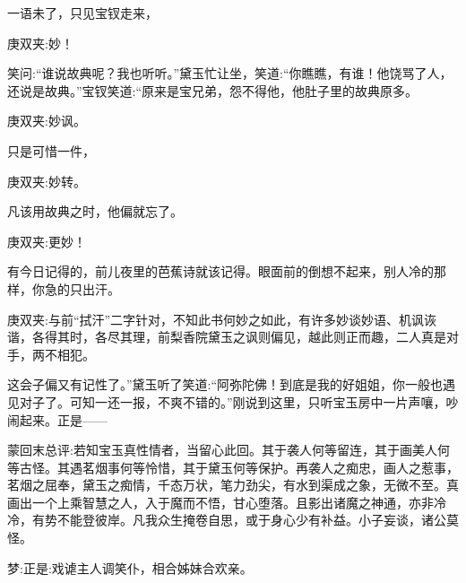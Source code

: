 \begin{parag}
    一语未了，只见宝钗走来，\begin{note}庚双夹:妙！\end{note}笑问:“谁说故典呢？我也听听。”黛玉忙让坐，笑道:“你瞧瞧，有谁！他饶骂了人，还说是故典。”宝钗笑道:“原来是宝兄弟，怨不得他，他肚子里的故典原多。\begin{note}庚双夹:妙讽。\end{note}只是可惜一件，\begin{note}庚双夹:妙转。\end{note}凡该用故典之时，他偏就忘了。\begin{note}庚双夹:更妙！\end{note}有今日记得的，前儿夜里的芭蕉诗就该记得。眼面前的倒想不起来，别人冷的那样，你急的只出汗。\begin{note}庚双夹:与前“拭汗”二字针对，不知此书何妙之如此，有许多妙谈妙语、机讽诙谐，各得其时，各尽其理，前梨香院黛玉之讽则偏见，越此则正而趣，二人真是对手，两不相犯。\end{note}这会子偏又有记性了。”黛玉听了笑道:“阿弥陀佛！到底是我的好姐姐，你一般也遇见对子了。可知一还一报，不爽不错的。”刚说到这里，只听宝玉房中一片声嚷，吵闹起来。正是——
\end{parag}


\begin{parag}
    \begin{note}蒙回末总评:若知宝玉真性情者，当留心此回。其于袭人何等留连，其于画美人何等古怪。其遇茗烟事何等怜惜，其于黛玉何等保护。再袭人之痴忠，画人之惹事，茗烟之屈奉，黛玉之痴情，千态万状，笔力劲尖，有水到渠成之象，无微不至。真画出一个上乘智慧之人，入于魔而不悟，甘心堕落。且影出诸魔之神通，亦非冷冷，有势不能登彼岸。凡我众生掩卷自思，或于身心少有补益。小子妄谈，诸公莫怪。\end{note}
\end{parag}


\begin{parag}
    \begin{note}梦:正是:戏谑主人调笑仆，相合姊妹合欢亲。\end{note}
\end{parag}
